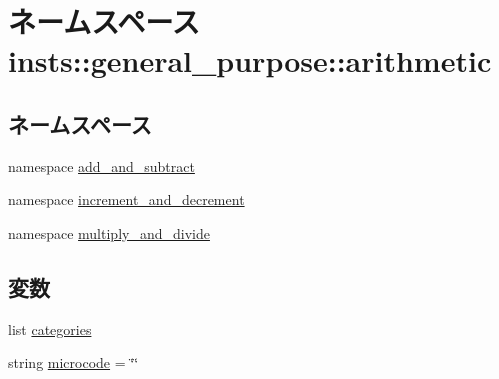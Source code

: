 \hypertarget{namespaceinsts_1_1general__purpose_1_1arithmetic}{
\section{ネームスペース insts::general\_\-purpose::arithmetic}
\label{namespaceinsts_1_1general__purpose_1_1arithmetic}
}
\subsection*{ネームスペース}
\begin{DoxyCompactItemize}
\item 
namespace \hyperlink{namespaceinsts_1_1general__purpose_1_1arithmetic_1_1add__and__subtract}{add\_\-and\_\-subtract}
\item 
namespace \hyperlink{namespaceinsts_1_1general__purpose_1_1arithmetic_1_1increment__and__decrement}{increment\_\-and\_\-decrement}
\item 
namespace \hyperlink{namespaceinsts_1_1general__purpose_1_1arithmetic_1_1multiply__and__divide}{multiply\_\-and\_\-divide}
\end{DoxyCompactItemize}
\subsection*{変数}
\begin{DoxyCompactItemize}
\item 
list \hyperlink{namespaceinsts_1_1general__purpose_1_1arithmetic_a273cf0f1630af14c1582f05e53354a55}{categories}
\item 
string \hyperlink{namespaceinsts_1_1general__purpose_1_1arithmetic_a770f11a173e99389a8802f0107ed8f52}{microcode} = \char`\"{}\char`\"{}
\end{DoxyCompactItemize}


